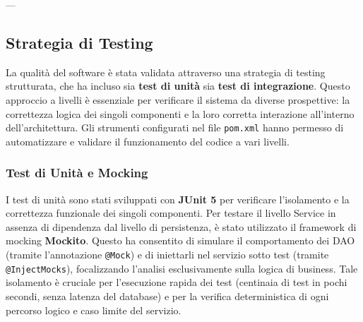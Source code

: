 ---

\subsection{Strategia di Testing}

La qualità del software è stata validata attraverso una strategia di testing strutturata, che ha incluso sia \textbf{test di unità} sia \textbf{test di integrazione}. Questo approccio a livelli è essenziale per verificare il sistema da diverse prospettive: la correttezza logica dei singoli componenti e la loro corretta interazione all'interno dell'architettura. Gli strumenti configurati nel file \texttt{pom.xml} hanno permesso di automatizzare e validare il funzionamento del codice a vari livelli.

\subsubsection{Test di Unità e Mocking}

I test di unità sono stati sviluppati con \textbf{JUnit 5} per verificare l'isolamento e la correttezza funzionale dei singoli componenti. Per testare il livello Service in assenza di dipendenza dal livello di persistenza, è stato utilizzato il framework di mocking \textbf{Mockito}. Questo ha consentito di simulare il comportamento dei DAO (tramite l'annotazione \texttt{@Mock}) e di iniettarli nel servizio sotto test (tramite \texttt{@InjectMocks}), focalizzando l'analisi esclusivamente sulla logica di business. Tale isolamento è cruciale per l'esecuzione rapida dei test (centinaia di test in pochi secondi, senza latenza del database) e per la verifica deterministica di ogni percorso logico e caso limite del servizio.

